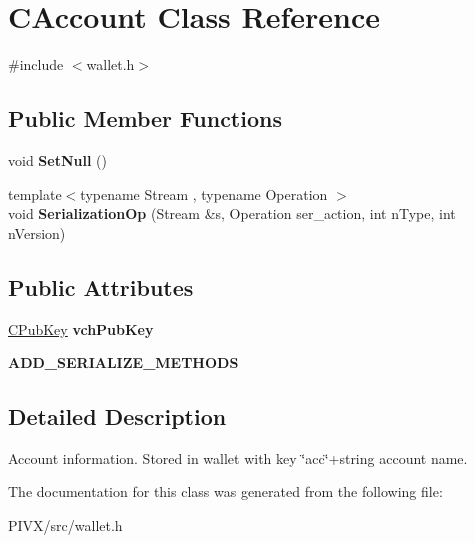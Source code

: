 \hypertarget{class_c_account}{}\section{C\+Account Class Reference}
\label{class_c_account}


{\ttfamily \#include $<$wallet.\+h$>$}

\subsection*{Public Member Functions}
\begin{DoxyCompactItemize}
\item 
\mbox{\label{class_c_account_ac63a4127fd899a21a5916a86588e809a}} 
void {\bfseries Set\+Null} ()
\item 
\mbox{\label{class_c_account_a645167419dead15544700e6ab2280a10}} 
{\footnotesize template$<$typename Stream , typename Operation $>$ }\\void {\bfseries Serialization\+Op} (Stream \&s, Operation ser\+\_\+action, int n\+Type, int n\+Version)
\end{DoxyCompactItemize}
\subsection*{Public Attributes}
\begin{DoxyCompactItemize}
\item 
\mbox{\label{class_c_account_a8bc9b476371009c12a6c25d4c7264de5}} 
\mbox{\hyperlink{class_c_pub_key}{C\+Pub\+Key}} {\bfseries vch\+Pub\+Key}
\item 
\mbox{\label{class_c_account_ad1054a718063912b1c5e1103eaa005cc}} 
{\bfseries A\+D\+D\+\_\+\+S\+E\+R\+I\+A\+L\+I\+Z\+E\+\_\+\+M\+E\+T\+H\+O\+DS}
\end{DoxyCompactItemize}


\subsection{Detailed Description}
Account information. Stored in wallet with key \char`\"{}acc\char`\"{}+string account name. 

The documentation for this class was generated from the following file\+:\begin{DoxyCompactItemize}
\item 
P\+I\+V\+X/src/wallet.\+h\end{DoxyCompactItemize}
